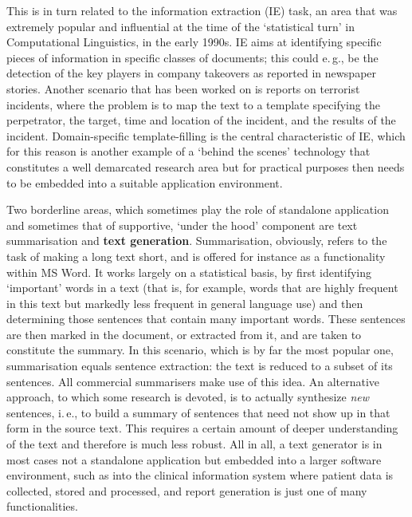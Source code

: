 \begin{multicols}{2}
This is in turn related to the information extraction (IE) task, an area that was extremely popular and influential at the time of the ‘statistical turn’ in Computational Linguistics, in the early 1990s. IE aims at identifying specific pieces of information in specific classes of documents; this could e.\,g., be the detection of the key players in company takeovers as reported in newspaper stories. Another scenario that has been worked on is reports on terrorist incidents, where the problem is to map the text to a template specifying the perpetrator, the target, time and location of the incident, and the results of the incident. Domain-specific template-filling is the central characteristic of IE, which for this reason is another example of a ‘behind the scenes’ technology that constitutes a well demarcated research area but for practical purposes then needs to be embedded into a suitable application environment. 


Two borderline areas, which sometimes play the role of standalone application and sometimes that of supportive, ‘under the hood’ component are text summarisation and \textbf{text generation}. Summarisation, obviously, refers to the task of making a long text short, and is offered for instance as a functionality within MS Word. It works largely on a statistical basis, by first identifying ‘important’ words in a text (that is, for example, words that are highly frequent in this text but markedly less frequent in general language use) and then determining those sentences that contain many important words. These sentences are then marked in the document, or extracted from it, and are taken to constitute the summary. In this scenario, which is by far the most popular one, summarisation equals sentence extraction: the text is reduced to a subset of its sentences. All commercial summarisers make use of this idea. An alternative approach, to which some research is devoted, is to actually synthesize \textit{new} sentences, i.\,e., to build a summary of sentences that need not show up in that form in the source text. This requires a certain amount of deeper understanding of the text and therefore is much less robust. All in all, a text generator is in most cases not a standalone application but embedded into a larger software environment, such as into the clinical information system where patient data is collected, stored and processed, and report generation is just one of many functionalities.


\end{multicols}

